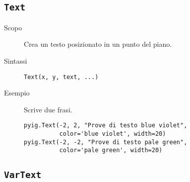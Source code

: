 \subsection{\lstinline{Text}}
\label{sub:geoint_text}

\begin{description}
 \item [Scopo] Crea un testo posizionato in un punto del piano.
 \item [Sintassi] \lstinline{Text(x, y, text, ...)}

 \item [Esempio] Scrive due frasi.

\begin{lstlisting}
pyig.Text(-2, 2, "Prove di testo blue violet", 
          color='blue violet', width=20)
pyig.Text(-2, -2, "Prove di testo pale green", 
          color='pale green', width=20)
\end{lstlisting}

\end{description}


\subsection{\lstinline{VarText}}
\label{sub:geoint_vartext}

